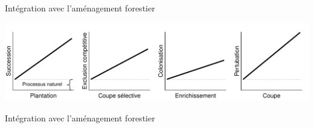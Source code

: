 \documentclass[11pt, compress, aspectratio=1610]{beamer}
\begin{document}
\begin{frame}{Intégration avec l’aménagement forestier}
\protect\hypertarget{intuxe9gration-avec-lamuxe9nagement-forestier}{}

\centering

\includegraphics[scale=0.65]{figures/managMechanism.pdf}

\par

\end{frame}

\begin{frame}{Intégration avec l’aménagement forestier}
\protect\hypertarget{intuxe9gration-avec-lamuxe9nagement-forestier-1}{}

\centering
\par

\end{frame}
\end{document}
